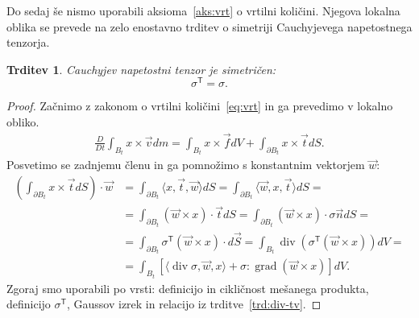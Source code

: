 \documentclass[12pt,a4paper,twoside]{article}
\theoremstyle{definition} %
\theoremstyle{plain} %
\newtheorem{trditev}[definicija]{Trditev}
\numberwithin{equation}{section}
\newcommand{\T}{\mathsf{T}}
\renewcommand{\div}{\operatorname{div}}
\newcommand{\grad}{\operatorname{grad}}
\newcommand{\DD}[2]{\ensuremath{\frac{D #1}{D #2}}}
\newcommand{\DDt}[1]{\DD{#1}{t}}
\newcommand{\vv}{\vec{v}}
\newcommand{\vt}{\vec{t}}
\newcommand{\vw}{\vec{w}}
\newcommand{\vn}{\vec{n}}
\newcommand{\vf}{\vec{f}}
\newcommand{\vx}{x}
\newcommand{\ts}{\sigma}
\begin{document}
Do sedaj še nismo uporabili aksioma~\ref{aks:vrt} o vrtilni količini.
Njegova lokalna oblika se prevede na zelo enostavno trditev o simetriji
Cauchyjevega napetostnega tenzorja.
\begin{trditev}
  \label{trd:sigma-symmetric}
  Cauchyjev napetostni tenzor je simetričen:
  \[ \ts^\T = \ts. \]
\end{trditev}
\begin{proof}
Začnimo z zakonom o vrtilni količini~\eqref{eq:vrt} in ga prevedimo v lokalno
obliko.
\begin{align*}
  \DDt{}\int_{B_t}\vx \times \vv dm = \int_{B_t} \vx \times \vf dV +
  \int_{\partial B_t} \vx\times\vt dS.
\end{align*}
Posvetimo se zadnjemu členu in ga pomnožimo s konstantnim vektorjem $\vw$:
\begin{align*}
\left(\int_{\partial B_t} \vx \times \vt dS\right)\cdot \vw  &=
  \int_{\partial B_t} \langle \vx, \vt, \vw \rangle dS =
  \int_{\partial B_t} \langle \vw, \vx, \vt \rangle dS = \\ &=
  \int_{\partial B_t} (\vw \times \vx) \cdot \vt dS =
  \int_{\partial B_t} (\vw \times \vx) \cdot \ts\vn dS = \\ &=
  \int_{\partial B_t} \ts^\T(\vw \times \vx) \cdot d\vec{S} =
  \int_{B_t} \div (\ts^\T(\vw \times \vx)) dV = \\ &=
\int_{B_t} [\langle \div \ts, \vw, \vx\rangle +  \ts : \grad (\vw \times \vx)] dV.
\end{align*}
Zgoraj smo uporabili po vrsti: definicijo in cikličnost mešanega produkta, definicijo
$\ts^\T$, Gaussov izrek in relacijo iz trditve~\ref{trd:div-tv}.


\end{proof}
\end{document}
